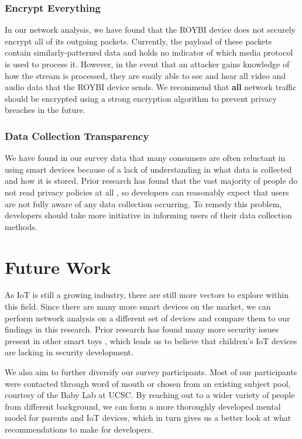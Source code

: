 \documentclass[12pt]{ucthesis}
\begin{document}
\subsubsection{Encrypt Everything}
In our network analysis, we have found that the ROYBI device does not securely encrypt all of its outgoing packets. Currently, the payload of these packets contain similarly-patterned data and holds no indicator of which media protocol is used to process it. However, in the event that an attacker gains knowledge of how the stream is processed, they are easily able to see and hear all video and audio data that the ROYBI device sends. We recommend that \textbf{all} network traffic should be encrypted using a strong encryption algorithm to prevent privacy breaches in the future.

\subsubsection{Data Collection Transparency}
We have found in our survey data that many consumers are often reluctant in using smart devices because of a lack of understanding in what data is collected and how it is stored. Prior research has found that the vast majority of people do not read privacy policies at all \cite{privacypolicy}, so developers can reasonably expect that users are not fully aware of any data collection occurring. To remedy this problem, developers should take more initiative in informing users of their data collection methods. 

\section{Future Work}
As IoT is still a growing industry, there are still more vectors to explore within this field. Since there are many more smart devices on the market, we can perform network analysis on a different set of devices and compare them to our findings in this research. Prior research has found many more security issues present in other smart toys \cite{cardenas:smarttoys}, which leads us to believe that children's IoT devices are lacking in security development.

We also aim to further diversify our survey participants. Most of our participants were contacted through word of mouth or chosen from an existing subject pool, courtesy of the Baby Lab at UCSC. By reaching out to a wider variety of people from different background, we can form a more thoroughly developed mental model for parents and IoT devices, which in turn gives us a better look at what recommendations to make for developers.
\end{document}
